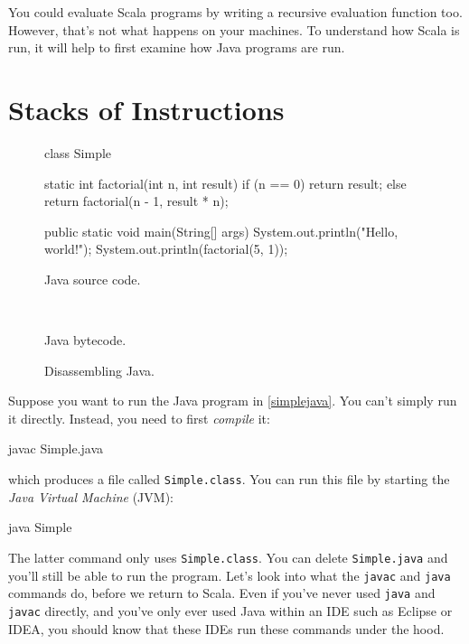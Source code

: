 \documentclass[9pt]{extbook}
\begin{document}
You could evaluate Scala programs by writing a recursive evaluation
function too. However, that's not what happens on your machines. To
understand how Scala is run, it will help to first examine how Java
programs are run.

\section{Stacks of Instructions}

\begin{figure}
\begin{minipage}{0.45\textwidth}
\begin{javacode}
class Simple {

  static int factorial(int n, int result) {
    if (n == 0) {
      return result;
    }
    else {
      return factorial(n - 1, result * n);
    }
  }

  public static void main(String[] args) {
    System.out.println("Hello, world!");
     System.out.println(factorial(5, 1));
  }

}
\end{javacode}
\caption{Java source code.}
\label{simplejava}
\end{minipage}
~\vrule~
\begin{minipage}{0.45\textwidth}
\caption{Java bytecode.}
\label{javabytecode}
\end{minipage}
\caption{Disassembling Java.}
\end{figure}

Suppose you want to run the Java program in \cref{simplejava}. You
can't simply run it directly. Instead, you need to first
\emph{compile} it:
\begin{console}
javac Simple.java
\end{console}
which produces a file called \verb|Simple.class|. You can run this file by starting
the \emph{Java Virtual Machine} (JVM):
\begin{console}
java Simple
\end{console}
The latter command only uses \verb|Simple.class|. You can delete \verb|Simple.java| and
you'll still be able to run the program. Let's look into what the \verb|javac| and
\verb|java| commands do, before we return to Scala. Even if you've never used \verb|java| and \verb|javac| directly, and you've
only ever used Java within an IDE such as Eclipse or IDEA, you should know that these
IDEs run these commands under the hood.
\end{document}
